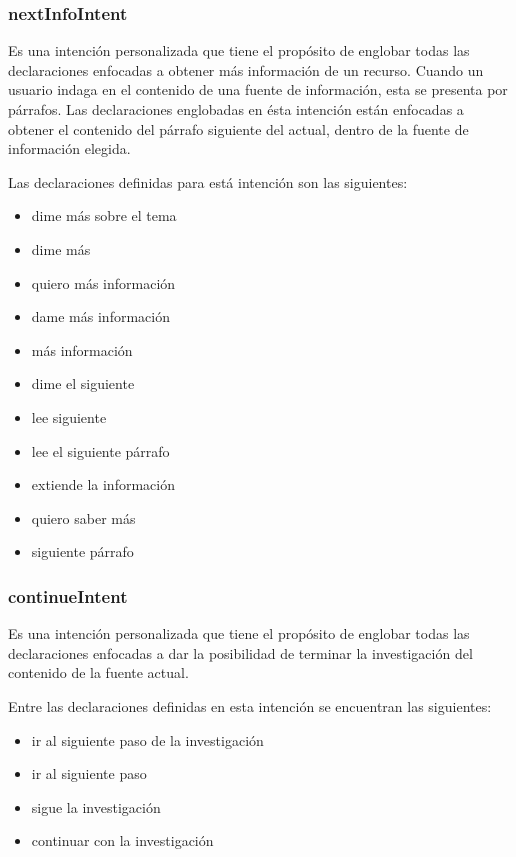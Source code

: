 \subsubsection{nextInfoIntent}
\label{nextInfoIntentcapIV}

Es una intención personalizada que tiene el propósito de englobar todas las declaraciones enfocadas a obtener más información de un recurso. Cuando un usuario indaga en el contenido de una fuente de información, esta se presenta por párrafos. Las declaraciones englobadas en ésta intención están enfocadas a obtener el contenido del párrafo siguiente del actual, dentro de la fuente de información elegida.

Las declaraciones definidas para está intención son las siguientes:

\begin{itemize}
  \item dime más sobre el tema
  \item dime más
  \item quiero más información
  \item dame más información
  \item más información
  \item dime el siguiente
  \item lee siguiente
  \item lee el siguiente párrafo
  \item extiende la información
  \item quiero saber más
  \item siguiente párrafo
\end{itemize}


\subsubsection{continueIntent}
\label{continueIntentcapIV}

Es una intención personalizada que tiene el propósito de englobar todas las declaraciones enfocadas a dar la posibilidad de terminar la investigación del contenido de la fuente actual.

Entre las declaraciones definidas en esta intención se encuentran las siguientes:

\begin{itemize}
  \item ir al siguiente paso de la investigación
  \item ir al siguiente paso
  \item sigue la investigación
  \item continuar con la investigación
\end{itemize}


